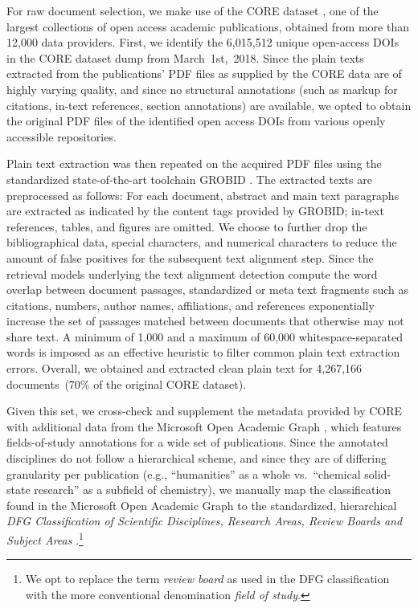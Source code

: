 For raw document selection, we make use of the CORE dataset \cite{knoth:2012}, one of the largest collections of open access academic publications, obtained from more than 12,000 data providers. First, we identify the 6,015,512 unique open-access DOIs in the CORE dataset dump from March~1st,~2018. Since the plain texts extracted from the publications' PDF files as supplied by the CORE data are of highly varying quality, and since no structural annotations (such as markup for citations, in-text references, section annotations) are available, we opted to obtain the original PDF files of the identified open access DOIs from various openly accessible repositories.

Plain text extraction was then repeated on the acquired PDF files using the standardized state-of-the-art toolchain GROBID \cite{lopez:2015}. The extracted texts are preprocessed as follows: For each document, abstract and main text paragraphs are extracted as indicated by the content tags provided by GROBID; in-text references, tables, and figures are omitted. We choose to further drop the bibliographical data, special characters, and numerical characters to reduce the amount of false positives for the subsequent text alignment step. Since the retrieval models underlying the text alignment detection compute the word overlap between document passages, standardized or meta text fragments such as citations, numbers, author names, affiliations, and references exponentially increase the set of passages matched between documents that otherwise may not share text. A minimum of 1,000 and a maximum of 60,000 whitespace-separated words is imposed as an effective heuristic to filter common plain text extraction errors. Overall, we obtained and extracted clean plain text for 4,267,166 documents~(70\% of the original CORE dataset).

Given this set, we cross-check and supplement the metadata provided by CORE with additional data from the Microsoft Open Academic Graph \cite{tang:2008,sinha:2015}, which features fields-of-study annotations for a wide set of publications. Since the annotated disciplines do not follow a hierarchical scheme, and since they are of differing granularity per publication (e.g., ``humanities'' as a whole vs.\ ``chemical solid-state research'' as a subfield of chemistry), we manually map the classification found in the Microsoft Open Academic Graph to the standardized, hierarchical \textit{DFG Classification of Scientific Disciplines, Research Areas, Review Boards and Subject Areas} \cite{dfg:2016}.\footnote{We opt to replace the term \textit{review board} as used in the DFG classification with the more conventional denomination \textit{field of study}.}




